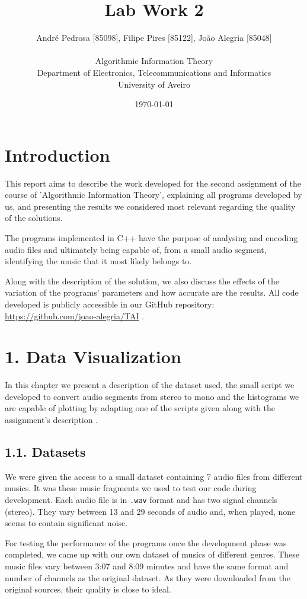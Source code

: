 \documentclass[12pt]{article}
\title{Lab Work 2}
\author
{André Pedrosa [85098], Filipe Pires [85122], João Alegria [85048]\\
\\
Algorithmic Information Theory\\
\normalsize{Department of Electronics, Telecommunications and Informatics}\\
\normalsize{University of Aveiro}\\
}
\date{\today{}}
\begin{document}
 

\baselineskip18pt

\maketitle 

\section*{Introduction}

This report aims to describe the work developed for the second assignment
of the course of 'Algorithmic Information Theory', explaining all programs
developed by us, and presenting the results we considered most relevant 
regarding the quality of the solutions. 

The programs implemented in C++ have the purpose of analysing and encoding
audio files and ultimately being capable of, from a small audio segment, 
identifying the music that it most likely belongs to.

Along with the description of the solution, we also discuss the effects
of the variation of the programs' parameters and how accurate are the results.
All code developed is publicly accessible in our GitHub repository:
\url{https://github.com/joao-alegria/TAI} .
\newpage

\section*{1. Data Visualization}

In this chapter we present a description of the dataset used, the small script 
we developed to convert audio segments from stereo to mono and the histograms
we are capable of plotting by adapting one of the scripts given along with the
assignment's description \cite{trab1}.

\subsection*{1.1. Datasets}

We were given the access to a small dataset containing 7 audio files from 
different musics. It was these music fragments we used to test our code during 
development.
Each audio file is in \texttt{.wav} format and has two signal channels (stereo).
They vary between 13 and 29 seconds of audio and, when played, none seems to 
contain significant noise.

For testing the performance of the programs once the development phase was
completed, we came up with our own dataset of musics of different genres.
These music files vary between 3:07 and 8:09 minutes and have the same format 
and number of channels as the original dataset.
As they were downloaded from the original sources, their quality is close to 
ideal.
\end{document}

